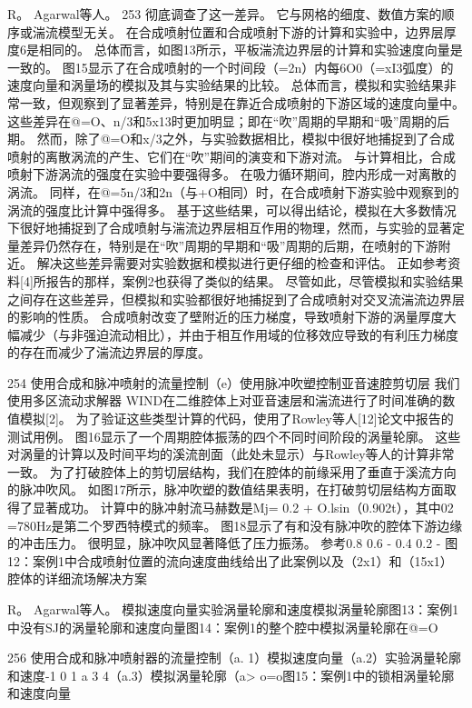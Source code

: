 \documentclass[UTF8,11pt,a4paper,openany,fontset=fandol]{ctexbook}
\begin{document}
R。 Agarwal等人。 253 彻底调查了这一差异。 它与网格的细度、数值方案的顺序或湍流模型无关。 在合成喷射位置和合成喷射下游的计算和实验中，边界层厚度6是相同的。 总体而言，如图13所示，平板湍流边界层的计算和实验速度向量是一致的。 图15显示了在合成喷射的一个时间段（=2n）内每6O0（=xI3弧度）的速度向量和涡量场的模拟及其与实验结果的比较。 总体而言，模拟和实验结果非常一致，但观察到了显著差异，特别是在靠近合成喷射的下游区域的速度向量中。 这些差异在@=O、n/3和5x13时更加明显；即在“吹”周期的早期和“吸”周期的后期。 然而，除了@=O和x/3之外，与实验数据相比，模拟中很好地捕捉到了合成喷射的离散涡流的产生、它们在“吹”期间的演变和下游对流。 与计算相比，合成喷射下游涡流的强度在实验中要强得多。 在吸力循环期间，腔内形成一对离散的涡流。 同样，在@=5n/3和2n（与+O相同）时，在合成喷射下游实验中观察到的涡流的强度比计算中强得多。 基于这些结果，可以得出结论，模拟在大多数情况下很好地捕捉到了合成喷射与湍流边界层相互作用的物理，然而，与实验的显著定量差异仍然存在，特别是在“吹”周期的早期和“吸”周期的后期，在喷射的下游附近。 解决这些差异需要对实验数据和模拟进行更仔细的检查和评估。 正如参考资料[4]所报告的那样，案例2也获得了类似的结果。 尽管如此，尽管模拟和实验结果之间存在这些差异，但模拟和实验都很好地捕捉到了合成喷射对交叉流湍流边界层的影响的性质。 合成喷射改变了壁附近的压力梯度，导致喷射下游的涡量厚度大幅减少（与非强迫流动相比），并由于相互作用域的位移效应导致的有利压力梯度的存在而减少了湍流边界层的厚度。

254 使用合成和脉冲喷射的流量控制（e）使用脉冲吹塑控制亚音速腔剪切层 我们使用多区流动求解器 WIND在二维腔体上对亚音速层和湍流进行了时间准确的数值模拟[2]。 为了验证这些类型计算的代码，使用了Rowley等人[12]论文中报告的测试用例。 图16显示了一个周期腔体振荡的四个不同时间阶段的涡量轮廓。 这些对涡量的计算以及时间平均的溪流剖面（此处未显示）与Rowley等人的计算非常一致。 为了打破腔体上的剪切层结构，我们在腔体的前缘采用了垂直于溪流方向的脉冲吹风。 如图17所示，脉冲吹塑的数值结果表明，在打破剪切层结构方面取得了显著成功。 计算中的脉冲射流马赫数是Mj= 0.2 + O.lsin（0.902t），其中02 =780Hz是第二个罗西特模式的频率。 图18显示了有和没有脉冲吹的腔体下游边缘的冲击压力。 很明显，脉冲吹风显著降低了压力振荡。 参考0.8 0.6 - 0.4 0.2 - 图12：案例1中合成喷射位置的流向速度曲线给出了此案例以及（2x1）和（15x1）腔体的详细流场解决方案

R。 Agarwal等人。 模拟速度向量实验涡量轮廓和速度模拟涡量轮廓图13：案例1中没有SJ的涡量轮廓和速度向量图14：案例1的整个腔中模拟涡量轮廓在@=O

256 使用合成和脉冲喷射器的流量控制（a. 1）模拟速度向量（a.2）实验涡量轮廓和速度-1 0 1 a 3 4（a.3）模拟涡量轮廓（a> o=o图15：案例1中的锁相涡量轮廓和速度向量
\end{document}
